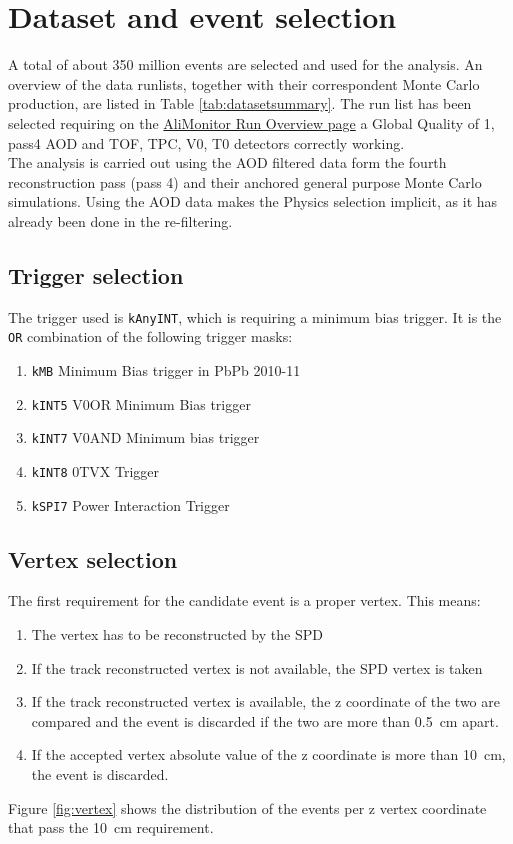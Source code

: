 \section{Dataset and event selection}
\label{sec:Dataset_and_event_selection}

A total of about 350 million events are selected and used for the analysis. An overview of the data runlists, together with their correspondent Monte Carlo production, are listed in Table \ref{tab:datasetsummary}. The run list has been selected requiring on the \href{https://alimonitor.cern.ch/configuration/index.jsp}{AliMonitor Run Overview page} a Global Quality of 1, pass4 AOD and TOF, TPC, V0, T0 detectors correctly working.\\
The analysis is carried out using the AOD filtered data form the fourth reconstruction pass (pass 4) and their anchored general purpose Monte Carlo simulations. Using the AOD data makes the Physics selection implicit, as it has already been done in the re-filtering.

\subsection{Trigger selection}
The trigger used is \texttt{kAnyINT}, which is requiring a minimum bias trigger. It is the \texttt{OR} combination of the following trigger masks:
\begin{enumerate}
\item \texttt{kMB} Minimum Bias trigger in PbPb 2010-11
\item \texttt{kINT5} V0OR Minimum Bias trigger
\item \texttt{kINT7} V0AND Minimum bias trigger
\item \texttt{kINT8} 0TVX Trigger
\item \texttt{kSPI7} Power Interaction Trigger
\end{enumerate}

\subsection{Vertex selection}
The first requirement for the candidate event is a proper vertex. This means:
\begin{enumerate}
\item The vertex has to be reconstructed by the SPD
\item If the track reconstructed vertex is not available, the SPD vertex is taken
\item If the track reconstructed vertex is available, the z coordinate of the two are compared and the event is discarded if the two are more than \SI{0.5}{\centi\meter} apart.
\item If the accepted vertex absolute value of the z coordinate is more than \SI{10}{\centi\meter}, the event is discarded.
\end{enumerate}
Figure \ref{fig:vertex} shows the distribution of the events per z vertex coordinate that pass the \SI{10}{\centi\meter} requirement.


